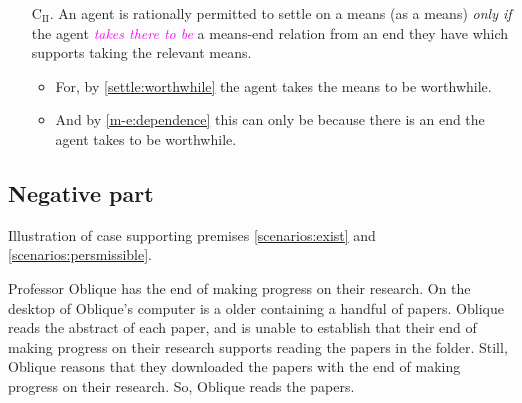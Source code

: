 \documentclass[10pt]{article}
\newcommand{\hozlinedash}[0]{%
  \noindent\hdashrule[0.5ex][c]{\textwidth}{.1pt}{2.5pt}
}
\begin{document}
\begin{enumerate}[label=\arabic*., ref=(\arabic*)]
\item[C\(_{\text{II}}\).] \label{together} An agent is rationally permitted to settle on a means (as a means) \emph{only if} the agent \textcolor{fuchsia}{\emph{takes there to be}} a means-end relation from an end they have which supports taking the relevant means.
  \begin{itemize}
  \item For, by \ref{settle:worthwhile} the agent takes the means to be worthwhile.
  \item And by \ref{m-e:dependence} this can only be because there is an end the agent takes to be worthwhile.
  \end{itemize}

\end{enumerate}

\newpage


\subsection{Negative part}
\label{sec:negative-part}


Illustration of case supporting premises \ref{scenarios:exist} and \ref{scenarios:persmissible}.

\hozlinedash



\begin{scenario}[Oblique]
  Professor Oblique has the end of making progress on their research.
  On the desktop of Oblique's computer is a older containing a handful of papers.
  Oblique reads the abstract of each paper, and is unable to establish that their end of making progress on their research supports reading the papers in the folder.
  Still, Oblique reasons that they downloaded the papers with the end of making progress on their research.
  So, Oblique reads the papers.
\end{scenario}
\end{document}
